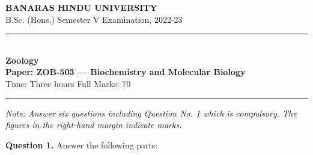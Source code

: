 \documentclass[11pt,a4paper]{article}
\begin{document}
\begin{center}
  {\large\bfseries BANARAS HINDU UNIVERSITY}\\[2pt]
  {\normalsize B.Sc. (Hons.) Semester V Examination, 2022-23}\\[6pt]
  \rule{0.8\linewidth}{0.5pt}\\[6pt]
  {\large\bfseries Zoology}\\[4pt]
  {\large\bfseries Paper: ZOB-503 --- Biochemistry and Molecular Biology}\\[4pt]
  {\normalsize Time: Three hours \hfill Full Marks: 70}
\end{center}

\rule{\linewidth}{0.4pt}

\smallskip



\noindent   \textit{Note: Answer six questions including Question No. 1 which is compulsory. The figures in the right-hand margin indicate marks.}

\bigskip




\noindent   \textbf{Question 1.} Answer the following parts:
\end{document}
